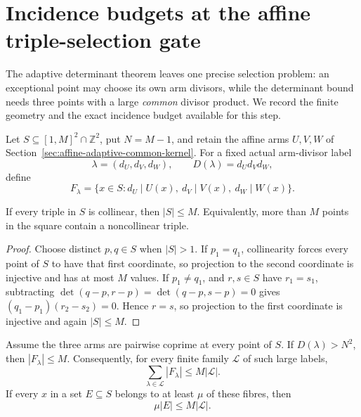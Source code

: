 \section{Incidence budgets at the affine triple-selection gate}
\label{sec:affine-common-kernel-triple-selection}

The adaptive determinant theorem leaves one precise selection problem: an
exceptional point may choose its own arm divisors, while the determinant bound
needs three points with a large \emph{common} divisor product.  We record the
finite geometry and the exact incidence budget available for this step.

Let $S\subseteq[1,M]^2\cap\mathbb Z^2$, put $N=M-1$, and retain the affine
arms $U,V,W$ of Section~\ref{sec:affine-adaptive-common-kernel}.  For a fixed
actual arm-divisor label
\[
 \lambda=(d_U,d_V,d_W),\qquad D(\lambda)=d_Ud_Vd_W,
\]
define
\[
 F_\lambda=\{x\in S:d_U\mid U(x),\ d_V\mid V(x),\ d_W\mid W(x)\}.
\]

\begin{lemma}\label{lem:affine-integer-line-cap}
If every triple in $S$ is collinear, then $|S|\le M$.  Equivalently, more
than $M$ points in the square contain a noncollinear triple.
\end{lemma}

\begin{proof}
Choose distinct $p,q\in S$ when $|S|>1$.  If $p_1=q_1$, collinearity forces
every point of $S$ to have that first coordinate, so projection to the second
coordinate is injective and has at most $M$ values.  If $p_1\ne q_1$, and
$r,s\in S$ have $r_1=s_1$, subtracting
$\det(q-p,r-p)=\det(q-p,s-p)=0$ gives
$(q_1-p_1)(r_2-s_2)=0$.  Hence $r=s$, so projection to the first coordinate
is injective and again $|S|\le M$.
\end{proof}

\begin{theorem}
\label{thm:affine-large-label-incidence}
Assume the three arms are pairwise coprime at every point of $S$.  If
$D(\lambda)>N^2$, then $|F_\lambda|\le M$.  Consequently, for every finite
family $\mathcal L$ of such large labels,
\[
 \sum_{\lambda\in\mathcal L}|F_\lambda|\le M|\mathcal L|.
\]
If every $x$ in a set $E\subseteq S$ belongs to at least $\mu$ of these
fibres, then
\begin{equation}\label{eq:affine-large-label-multiplicity}
                         \mu|E|\le M|\mathcal L|.
\end{equation}
\end{theorem}

